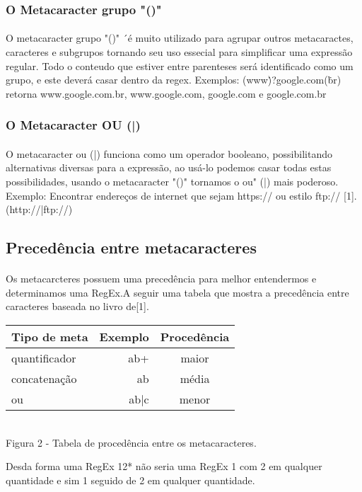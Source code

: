 \documentclass[10pt,a4paper]{article}
\begin{document}
\subsubsection{O Metacaracter grupo "()"}
\paragraph*{}
O metacaracter grupo "()" ´é muito utilizado para agrupar outros metacaractes, caracteres e subgrupos tornando seu uso essecial para simplificar uma expressão regular. Todo o conteudo que estiver entre parenteses será identificado como um grupo, e este deverá casar dentro da regex.\newline
Exemplos:\newline
(www\.)?google.com(\.br) retorna www.google.com.br, www.google.com, google.com e google.com.br
\subsubsection{O Metacaracter OU (|)}
\paragraph*{}
O metacaracter ou (|) funciona como um operador booleano, possibilitando alternativas diversas para a expressão, ao usá-lo podemos casar todas estas possibilidades, usando o metacaracter "()" tornamos o ou" (|) mais poderoso.\newline
Exemplo:\newline
Encontrar endereços de internet que sejam https:// ou estilo ftp:// [1].\newline
(http://|ftp://)
\subsection{Precedência entre metacaracteres}
\paragraph{}
Os metacarcteres possuem uma precedência para melhor entendermos e determinamos uma RegEx.A seguir uma tabela que mostra a precedência entre caracteres baseada no livro de[1].
\begin {center}
\begin{tabular}{|l|r|c|} \hline 
Tipo de meta & Exemplo & Procedência\\ \hline
quantificador & ab+ & maior\\ \hline
concatenação & ab & média\\ \hline
ou & ab|c & menor\\ \hline
\end{tabular} \\ 
Figura 2 - Tabela de procedência entre os metacaracteres.
\end {center}
Desda forma uma RegEx 12* não seria uma RegEx 1 com 2 em qualquer quantidade e sim 1 seguido de 2 em qualquer quantidade.\newline
\end{document}
